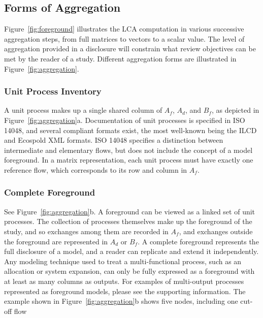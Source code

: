 \subsection{Forms of Aggregation}

Figure~\ref{fig:foreground} illustrates the LCA computation in various successive aggregation steps, from full matrices to vectors to a scalar value.  The level of aggregation provided in a disclosure will constrain what review objectives can be met by the reader of a study.  Different aggregation forms are illustrated in Figure~\ref{fig:aggregation}.

\subsubsection{Unit Process Inventory}

A unit process makes up a single shared column of $A_f$, $A_d$, and $B_f$, as depicted in Figure~\ref{fig:aggregation}a.  Documentation of unit processes is specified in ISO 14048, and several compliant formats exist, the most well-known being the ILCD and Ecospold XML formats.  ISO 14048 specifies a distinction between intermediate and elementary flows, but does not include the concept of a model foreground.  In a matrix representation, each unit process must have exactly one reference flow, which corresponds to its row and column in $A_f$.



\subsubsection{Complete Foreground}

See Figure~\ref{fig:aggregation}b.  A foreground can be viewed as a linked set of unit processes.  The collection of processes themselves make up the foreground of the study, and so exchanges among them are recorded in $A_f$, and exchanges outside the foreground are represented in $A_d$ or $B_f$.  A complete foreground represents
the full disclosure of a model, and a reader can replicate and extend it independently.
Any modeling technique used to treat a multi-functional process, such as an allocation or system expansion, can only be fully expressed as a foreground with at least as many columns as outputs.  For examples of multi-output processes represented as foreground models, please see the supporting information.  The example shown in Figure~\ref{fig:aggregation}b shows five nodes, including one cut-off flow

